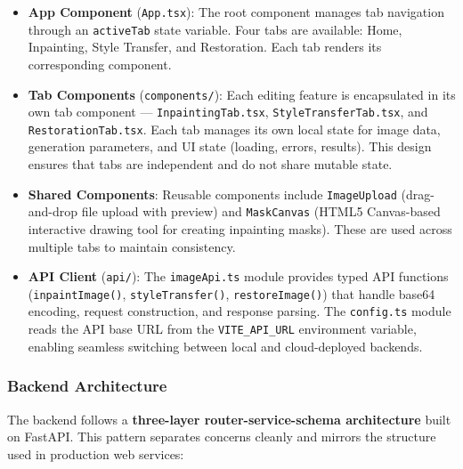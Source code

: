 \documentclass[12pt,a4paper]{report}
\begin{document}
\begin{itemize}
    \item \textbf{App Component} (\texttt{App.tsx}): The root component manages tab navigation through an \texttt{activeTab} state variable. Four tabs are available: Home, Inpainting, Style Transfer, and Restoration. Each tab renders its corresponding component.

    \item \textbf{Tab Components} (\texttt{components/}): Each editing feature is encapsulated in its own tab component --- \texttt{InpaintingTab.tsx}, \texttt{Style\-Transfer\-Tab.tsx}, and \texttt{Restoration\-Tab.tsx}. Each tab manages its own local state for image data, generation parameters, and UI state (loading, errors, results). This design ensures that tabs are independent and do not share mutable state.

    \item \textbf{Shared Components}: Reusable components include \texttt{ImageUpload} (drag-and-drop file upload with preview) and \texttt{MaskCanvas} (HTML5 Canvas-based interactive drawing tool for creating inpainting masks). These are used across multiple tabs to maintain consistency.

    \item \textbf{API Client} (\texttt{api/}): The \texttt{imageApi.ts} module provides typed API functions (\texttt{inpaintImage()}, \texttt{styleTransfer()}, \texttt{restoreImage()}) that handle base64 encoding, request construction, and response parsing. The \texttt{config.ts} module reads the API base URL from the \texttt{VITE\_API\_URL} environment variable, enabling seamless switching between local and cloud-deployed backends.
\end{itemize}

\subsubsection{Backend Architecture}

The backend follows a \textbf{three-layer router-service-schema architecture} built on FastAPI. This pattern separates concerns cleanly and mirrors the structure used in production web services:
\end{document}
